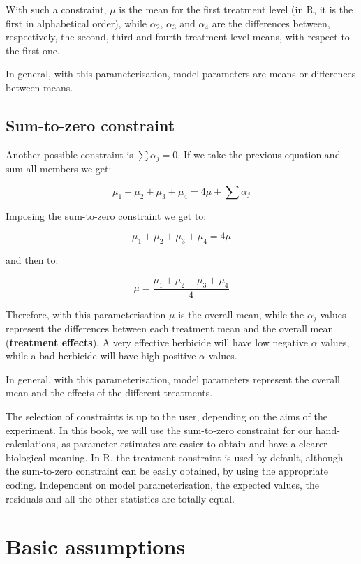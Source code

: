 \documentclass[a4paper,12pt,oneside]{book}
\begin{document}
With such a constraint, \(\mu\) is the mean for the first treatment level (in R, it is the first in alphabetical order), while \(\alpha_2\), \(\alpha_3\) and \(\alpha_4\) are the differences between, respectively, the second, third and fourth treatment level means, with respect to the first one.

In general, with this parameterisation, model parameters are means or differences between means.

\hypertarget{sum-to-zero-constraint}{%
\subsection{Sum-to-zero constraint}\label{sum-to-zero-constraint}}

Another possible constraint is \(\sum{\alpha_j} = 0\). If we take the previous equation and sum all members we get:

\[\mu_1 + \mu_2 + \mu_3 + \mu_4 = 4 \mu + \sum{\alpha_j}\]

Imposing the sum-to-zero constraint we get to:

\[\mu_1 + \mu_2 + \mu_3 + \mu_4 = 4 \mu\]

and then to:

\[\mu = \frac{\mu_1 + \mu_2 + \mu_3 + \mu_4}{4}\]

Therefore, with this parameterisation \(\mu\) is the overall mean, while the \(\alpha_j\) values represent the differences between each treatment mean and the overall mean (\textbf{treatment effects}). A very effective herbicide will have low negative \(\alpha\) values, while a bad herbicide will have high positive \(\alpha\) values.

In general, with this parameterisation, model parameters represent the overall mean and the effects of the different treatments.

The selection of constraints is up to the user, depending on the aims of the experiment. In this book, we will use the sum-to-zero constraint for our hand-calculations, as parameter estimates are easier to obtain and have a clearer biological meaning. In R, the treatment constraint is used by default, although the sum-to-zero constraint can be easily obtained, by using the appropriate coding. Independent on model parameterisation, the expected values, the residuals and all the other statistics are totally equal.

\hypertarget{basic-assumptions}{%
\section{Basic assumptions}\label{basic-assumptions}}
\end{document}
